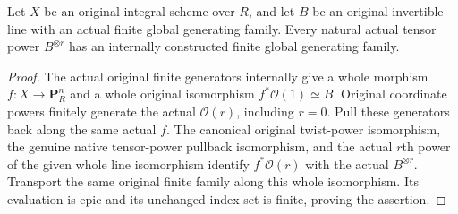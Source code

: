 \begin{lemma}
\label{lem:fc-original-generated-line-tensor-powers}
\leanok
{}
Let $X$ be an original integral scheme over $R$, and let $B$ be an
original invertible line with an actual finite global generating family.
Every natural actual tensor power $B^{\otimes r}$ has an internally
constructed finite global generating family.
\end{lemma}
\begin{proof}
The actual original finite generators internally give a whole morphism
$f:X\to\mathbf P^n_R$ and a whole original isomorphism
$f^*\mathcal O(1)\simeq B$. Original coordinate powers finitely generate
the actual $\mathcal O(r)$, including $r=0$. Pull these generators back
along the same actual $f$. The canonical original twist-power
isomorphism, the genuine native tensor-power pullback isomorphism, and
the actual $r$th power of the given whole line isomorphism identify
$f^*\mathcal O(r)$ with the actual $B^{\otimes r}$. Transport the same
original finite family along this whole isomorphism. Its evaluation is
epic and its unchanged index set is finite, proving the assertion.
\end{proof}
